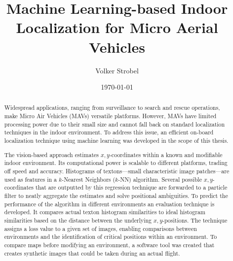 \documentclass[11pt]{report}
\title{Machine Learning-based Indoor Localization for Micro
  Aerial Vehicles}
\author{Volker Strobel}
\date{\today}
\begin{document}
\maketitle
\begin{abstract}
  Widespread applications, ranging from surveillance to search and
  rescue operations, make Micro Air Vehicles (MAVs) versatile
  platforms. However, MAVs have limited processing power due to their
  small size and cannot fall back on standard localization techniques
  in the indoor environment.
  To address this issue, an efficient on-board
  localization technique using machine learning was developed in the
  scope of this thesis.

  The vision-based approach estimates $x,y$-coordinates within a known
  and modifiable indoor environment. Its computational power is
  scalable to different platforms, trading off speed and
  accuracy. Histograms of textons---small characteristic image
  patches---are used as features in a $k$-Nearest Neighbors ($k$-NN)
  algorithm. Several possible $x,y$-coordinates that are outputted by
  this regression technique are forwarded to a particle filter to
  neatly aggregate the estimates and solve positional ambiguities.
  To predict the performance of the algorithm in different
  environments an evaluation technique is developed. It compares
  actual texton histogram similarities to ideal histogram similarities
  based on the distance between the underlying $x,y$-positions. The
  technique assigns a loss value to a given set of images, enabling
  comparisons between environments and the identification of critical
  positions within an environment. To compare maps before modifying an
  environment, a software tool was created that creates synthetic
  images that could be taken during an actual flight.




\end{abstract}
\end{document}
